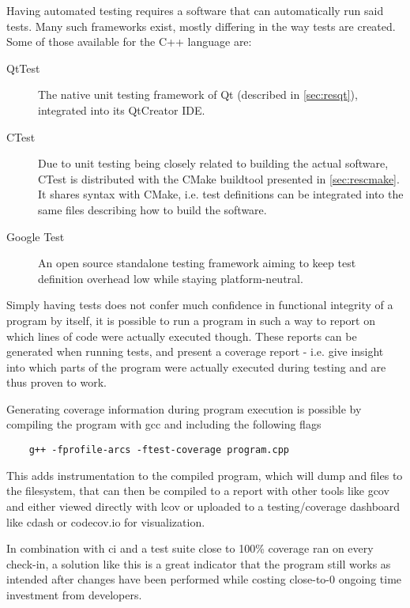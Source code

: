 Having automated testing requires a software that can automatically run said tests. Many such frameworks exist, mostly differing in the way tests are created. Some of those available for the C++ language are:
\begin{description}
	\item[QtTest] The native unit testing framework of Qt (described in \ref{sec:resqt}), integrated into its QtCreator IDE.
	\item[CTest] Due to unit testing being closely related to building the actual software, CTest is distributed with the CMake buildtool presented in \ref{sec:rescmake}. It shares syntax with CMake, i.e. test definitions can be integrated into the same files describing how to build the software.
	\item[Google Test]  An open source standalone testing framework aiming to keep test definition overhead low while staying platform-neutral.
\end{description}

Simply having tests does not confer much confidence in functional integrity of a program by itself, it is possible to run a program in such a way to report on which lines of code were actually executed though. These reports can be generated when running tests, and present a \gls{coverage} report - i.e. give insight into which parts of the program were actually executed during testing and are thus proven to work.

Generating coverage information during program execution is possible by compiling the program with gcc and including the following flags
\begin{lstlisting}
	g++ -fprofile-arcs -ftest-coverage program.cpp
\end{lstlisting}

This adds instrumentation to the compiled program, which will dump  and  files to the filesystem, that can then be compiled to a report with other tools like gcov and either viewed directly with lcov or uploaded to a testing/coverage dashboard like cdash or codecov.io for visualization.

In combination with \gls{ci} and a test suite close to 100\% \gls{coverage} ran on every check-in, a solution like this is a great indicator that the program still works as intended after changes have been performed while costing close-to-0 ongoing time investment from developers.

